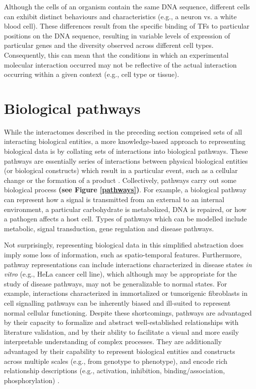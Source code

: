 Although the cells of an organism contain the same DNA sequence, different cells can exhibit distinct behaviours and characteristics (e.g., a neuron vs. a white blood cell). These differences result from the specific binding of TFs to particular positions on the DNA sequence, resulting in variable levels of expression of particular genes and the diversity observed across different cell types. Consequently, this can mean that the conditions in which an experimental molecular interaction occurred may not be reflective of the actual interaction occurring within a given context (e.g., cell type or tissue). 

\section{Biological pathways}

While the interactomes described in the preceding section comprised sets of all interacting biological entities, a more knowledge-based approach to representing biological data is by collating sets of interactions into biological pathways. These pathways are essentially series of interactions between physical biological entities (or biological constructs) which result in a particular event, such as a cellular change or the formation of a product \parencite{pathways2020}. Collectively, pathways carry out some biological process \textbf{(see Figure \ref{pathways})}. For example, a biological pathway can represent how a signal is transmitted from an external to an internal environment, a particular carbohydrate is metabolized, DNA is repaired, or how a pathogen affects a host cell. Types of pathways which can be modelled include metabolic, signal transduction, gene regulation and disease pathways.

Not surprisingly, representing biological data in this simplified abstraction does imply some loss of information, such as spatio-temporal features. Furthermore, pathway representations can include interactions characterized in disease states \textit{in vitro} (e.g., HeLa cancer cell line), which although may be appropriate for the study of disease pathways, may not be generalizable to normal states. For example, interactions characterized in immortalized or tumorigenic fibroblasts in cell signalling pathways can be inherently biased and ill-suited to represent normal cellular functioning. Despite these shortcomings, pathways are advantaged by their capacity to formalize and abstract well-established relationships with literature validation, and by their ability to facilitate a visual and more easily interpretable understanding of complex processes. They are additionally advantaged by their capability to represent biological entities and constructs across multiple scales (e.g., from genotype to phenotype), and encode rich relationship descriptions (e.g., activation, inhibition, binding/association, phosphorylation) \parencite{joshi2005}.

